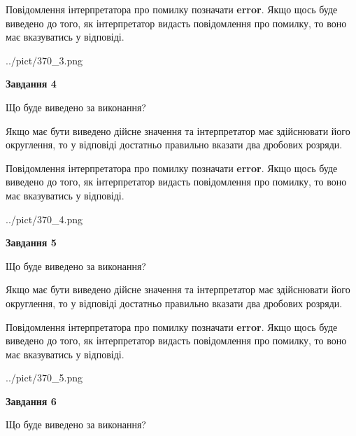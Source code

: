 \documentclass[12pt, ukrainian]{article}
\begin{document}
{\begin {Large}
Повідомлення інтерпретатора про помилку позначати \textbf{error}.
Якщо щось буде виведено до того, як інтерпретатор видасть повідомлення про помилку, 
то воно має вказуватись у відповіді. \par

\begin{center}
	{../pict/370_3.png}
\end{center}
\newpage

{\begin {center}\textbf{Завдання 4}\end {center}}\par
Що буде виведено за виконання? \par

Якщо має бути виведено дійсне значення та інтерпретатор має здійснювати його округлення, 
то у відповіді достатньо правильно вказати два дробових розряди.

Повідомлення інтерпретатора про помилку позначати \textbf{error}.
Якщо щось буде виведено до того, як інтерпретатор видасть повідомлення про помилку, 
то воно має вказуватись у відповіді. \par

\begin{center}
	{../pict/370_4.png}
\end{center}
\newpage

{\begin {center}\textbf{Завдання 5}\end {center}}\par
Що буде виведено за виконання? \par

Якщо має бути виведено дійсне значення та інтерпретатор має здійснювати його округлення, 
то у відповіді достатньо правильно вказати два дробових розряди.

Повідомлення інтерпретатора про помилку позначати \textbf{error}.
Якщо щось буде виведено до того, як інтерпретатор видасть повідомлення про помилку, 
то воно має вказуватись у відповіді. \par

\begin{center}
	{../pict/370_5.png}
\end{center}
\newpage

{\begin {center}\textbf{Завдання 6}\end {center}}\par
Що буде виведено за виконання? \par


\end{Large}}
\end{document}
